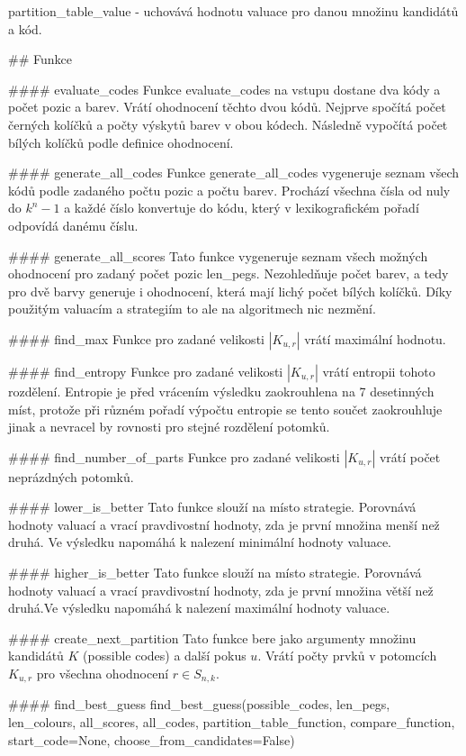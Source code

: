 \documentclass[12pt,a4paper]{article}
\begin{document}
partition_table_value - uchovává hodnotu valuace pro danou množinu kandidátů a kód.


## Funkce

#### evaluate_codes
Funkce evaluate_codes na vstupu dostane dva kódy a počet pozic a barev. Vrátí ohodnocení těchto dvou kódů. Nejprve spočítá počet černých kolíčků a počty výskytů barev v obou kódech. Následně vypočítá počet bílých kolíčků podle definice ohodnocení. 

#### generate_all_codes
Funkce generate_all_codes vygeneruje seznam všech kódů podle zadaného počtu pozic a počtu barev. Prochází všechna čísla od nuly do $k^n - 1$ a každé číslo konvertuje do kódu, který v lexikografickém pořadí odpovídá danému číslu. 

#### generate_all_scores
Tato funkce vygeneruje seznam všech možných ohodnocení pro zadaný počet pozic len_pegs. Nezohledňuje počet barev, a tedy pro dvě barvy generuje i ohodnocení, která mají lichý počet bílých kolíčků. Díky použitým valuacím a strategiím to ale na algoritmech nic nezmění.

#### find_max
Funkce pro zadané velikosti $|K_{u,r}|$ vrátí maximální hodnotu. 

#### find_entropy
Funkce pro zadané velikosti $|K_{u,r}|$ vrátí entropii tohoto rozdělení. Entropie je před vrácením výsledku zaokrouhlena na 7 desetinných míst, protože při různém pořadí výpočtu entropie se tento součet zaokrouhluje jinak a nevracel by rovnosti pro stejné rozdělení potomků.

#### find_number_of_parts
Funkce pro zadané velikosti $|K_{u,r}|$ vrátí počet neprázdných potomků.

#### lower_is_better
Tato funkce slouží na místo strategie. Porovnává hodnoty valuací a vrací pravdivostní hodnoty, zda je první množina menší než druhá. Ve výsledku napomáhá k nalezení minimální hodnoty valuace.

#### higher_is_better
Tato funkce slouží na místo strategie. Porovnává hodnoty valuací a vrací pravdivostní hodnoty, zda je první množina větší než druhá.Ve výsledku napomáhá k nalezení maximální hodnoty valuace.

#### create_next_partition
Tato funkce bere jako argumenty množinu kandidátů $K$ (possible codes) a další pokus $u$. Vrátí počty prvků v potomcích $K_{u,r}$ pro všechna ohodnocení $r \in S_{n,k}$.

#### find_best_guess
find_best_guess(possible_codes, len_pegs, len_colours, all_scores, all_codes, partition_table_function, compare_function, start_code=None, choose_from_candidates=False)
\end{document}
